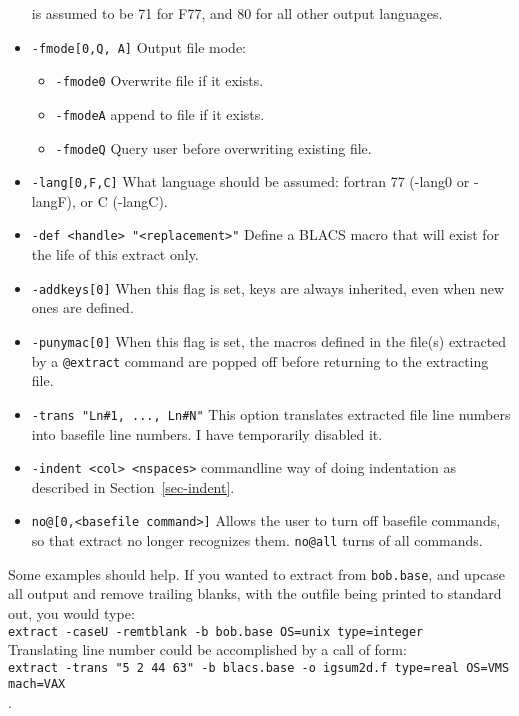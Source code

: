 \begin{itemize}
   is assumed to be 71 for F77, and 80 for all other output languages.
\item {\tt -fmode[0,Q, A]}  Output file mode:
   \begin{itemize}
   \item {\tt -fmode0} Overwrite file if it exists.
   \item {\tt -fmodeA} append to file if it exists.
   \item {\tt -fmodeQ} Query user before overwriting existing file.
   \end{itemize}
\item {\tt -lang[0,F,C]} What language should be assumed: fortran 77 
(-lang0 or -langF), or C (-langC).
\item {\verb+-def <handle> "<replacement>"+}  Define a BLACS macro that will
exist for the life of this extract only.
\item {\tt -addkeys[0]} When this flag is set, keys are always inherited, even
when new ones are defined.
\item {\tt -punymac[0]} When this flag is set, the macros defined in the
file(s) extracted by a {\tt @extract} command are popped off before returning
to the extracting file.
\item {\tt -trans "Ln\#1, ..., Ln\#N"}  This option translates extracted file
line numbers into basefile line numbers.  I have temporarily disabled it.
\item{\tt -indent <col> <nspaces>}  commandline way of doing indentation
as described in Section~\ref{sec-indent}.
\item {\tt no@[0,<basefile command>]}  Allows the user to turn off basefile
commands, so that extract no longer recognizes them.  {\tt no@all} turns
of all commands.
\end{itemize}

Some examples should help.  If you wanted to extract from {\tt bob.base},
and upcase all output and remove trailing blanks, with the outfile being
printed to standard out, you would type:\\
{\tt extract -caseU -remtblank -b bob.base OS=unix type=integer}\\
Translating line number could be accomplished by a call of form:\\
\verb|extract -trans "5 2 44 63" -b blacs.base -o igsum2d.f type=real OS=VMS mach=VAX|\\.

